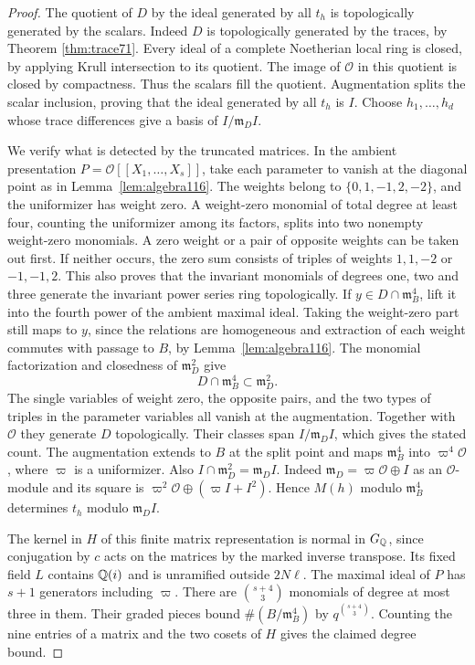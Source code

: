 \documentclass[a4paper,11pt]{article}
\theoremstyle{definition}
\theoremstyle{remark}
\numberwithin{equation}{section}
\newcommand{\OO}{\mathcal O}
\begin{document}
\begin{proof}
The quotient of \(D\) by the ideal generated by all \(t_h\)
is topologically generated by the scalars.
Indeed \(D\) is topologically generated by the traces, by
Theorem \ref{thm:trace71}.
Every ideal of a complete Noetherian local ring is closed,
by applying Krull intersection to its quotient. The image of
\(\OO\) in this quotient is closed by compactness. Thus the
scalars fill the quotient. Augmentation splits the scalar
inclusion, proving that the ideal generated by all \(t_h\)
is \(I\). Choose \(h_1,\ldots,h_d\) whose trace differences
give a basis of \(I/\mathfrak m_DI\).

We verify what is detected by the truncated matrices. In the
ambient presentation \(P=\OO[[X_1,\ldots,X_s]]\), take each
parameter to vanish at the diagonal point as in
Lemma~\ref{lem:algebra116}. The weights belong to
\(\{0,1,-1,2,-2\}\), and the uniformizer has weight zero.
A weight-zero monomial of total degree at least four, counting
the uniformizer among its factors, splits into two nonempty
weight-zero monomials. A zero weight or a pair of opposite
weights can be taken out first. If neither occurs, the zero
sum consists of triples of weights \(1,1,-2\) or \(-1,-1,2\).
This also proves that the invariant monomials of degrees one,
two and three generate the invariant power series ring
topologically. If \(y\in D\cap\mathfrak m_B^4\), lift it into
the fourth power of the ambient maximal ideal. Taking the
weight-zero part still maps to \(y\), since the relations are
homogeneous and extraction of each weight commutes with passage
to \(B\), by Lemma~\ref{lem:algebra116}. The monomial
factorization and closedness of \(\mathfrak m_D^2\) give
\[
                    D\cap\mathfrak m_B^4\subset\mathfrak m_D^2 .
\]
The single variables of weight zero, the opposite pairs, and
the two types of triples in the parameter variables all vanish
at the augmentation. Together with \(\OO\) they generate \(D\)
topologically. Their classes span \(I/\mathfrak m_D I\), which
gives the stated count.
The augmentation extends to \(B\) at the split point and maps
\(\mathfrak m_B^4\) into \(\varpi^4\OO\), where \(\varpi\) is
a uniformizer. Also \(I\cap\mathfrak m_D^2=\mathfrak m_D I\).
Indeed \(\mathfrak m_D=\varpi\OO\oplus I\) as an
\(\OO\)-module and its square is
\(\varpi^2\OO\oplus(\varpi I+I^2)\). Hence \(M(h)\) modulo
\(\mathfrak m_B^4\) determines \(t_h\) modulo
\(\mathfrak m_DI\).

The kernel in \(H\) of this finite matrix representation is
normal in \(G_\mathbb Q\), since conjugation by \(c\) acts on the
matrices by the marked inverse transpose. Its fixed field
\(L\) contains \(\mathbb Q(i)\) and is unramified outside \(2N\ell\).
The maximal ideal of \(P\) has \(s+1\) generators including
\(\varpi\). There are \(\binom{s+4}{3}\) monomials of degree
at most three in them. Their graded pieces bound
\(\#(B/\mathfrak m_B^4)\) by \(q^{\binom{s+4}{3}}\).
Counting the nine entries of a matrix and the two cosets of
\(H\) gives the claimed degree bound.


\end{proof}
\end{document}
